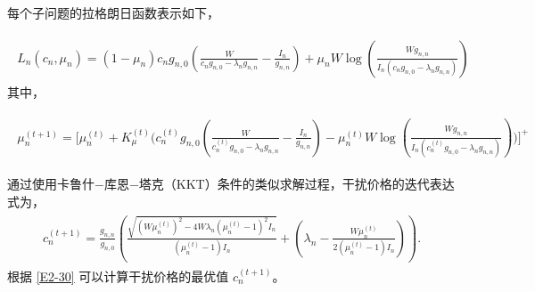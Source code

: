 每个子问题的拉格朗日函数表示如下，

\begin{eqnarray}\label{E2-28}
\begin{array}{lll}
\!\!\!\!\textit{L}_n(c_n, \mu_n)=(1-\mu_n)c_{n} g_{n,0}\left(\frac{W}{c_n g_{n,0}-\lambda_n g_{n,n}}-\frac{I_n}{g_{n,n}}\right)
+\mu_n W \log\left(\frac{W g_{n,n}}{I_n (c_n g_{n,0}-\lambda_n g_{n,n}) }\right)
\end{array}
\end{eqnarray}
其中，

\begin{eqnarray}\label{E2-29}
\begin{array}{lll}
\!\!\!\mu_n^{(t+1)}=\Big[\mu_n^{(t)}\!\!+\!K_{\mu}^{(t)}\big(c_{n}^{(t)} g_{n,0}(\frac{W}{c_n^{(t)} g_{n,0}-\lambda_n g_{n,n}}-\frac{I_n}{g_{n,n}})-\mu_n^{(t)} W \log(\frac{W g_{n,n}}{I_n (c_n^{(t)} g_{n,0}-\lambda_n g_{n,n}) })\big)\Big]^+
\end{array}
\end{eqnarray}

通过使用卡鲁什$-$库恩$-$塔克（KKT）条件的类似求解过程，干扰价格的迭代表达式为，
\begin{eqnarray}\label{E2-30}
 \begin{array}{lll}
\!\!\!\!c_n^{(t+1)}\!\!\!=\!\!\frac{g_{n,n}}{g_{n,0}}\!\!\left(\!\!\frac{ \sqrt{(W\mu_n^{(t)})^{2}\!-4W\lambda_n(\mu_n^{(t)}\!\!-\!1)^2I_n}}{(\mu_n^{(t)}-1)I_n}\!\!+\!\! (\lambda_n\!\!\!-\!\!\frac{W\mu_n^{(t)}}{2(\mu_n^{(t)}\!\!-\!1)I_n})\!\!\right).\!\!\!\!
\end{array}
\end{eqnarray}
根据 \eqref{E2-30} 可以计算干扰价格的最优值 $c_{n}^{(t+1)}$。

